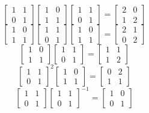 \documentclass[12pt]{article}
\begin{document}
    \[ \begin{bmatrix} 1 & 1 \\
        0 & 1 \end{bmatrix}
        \begin{bmatrix} 1 & 0 \\
            1 & 1 \end{bmatrix}
        \begin{bmatrix} 1 & 1 \\
            0 & 1 \end{bmatrix}
        = \begin{bmatrix} 2 & 0 \\
        1 & 2 \end{bmatrix}  \]
    \[ \begin{bmatrix} 1 & 0 \\
        1 & 1 \end{bmatrix}
        \begin{bmatrix} 1 & 1 \\
            0 & 1 \end{bmatrix}
        \begin{bmatrix} 1 & 0 \\
            1 & 1 \end{bmatrix}
        = \begin{bmatrix} 2 & 1 \\
        0 & 2 \end{bmatrix}  \]
    \[ \begin{bmatrix} 1 & 0 \\
        1 & 1 \end{bmatrix}
        \begin{bmatrix} 1 & 1 \\
            0 & 1 \end{bmatrix}
        = \begin{bmatrix} 1 & 1 \\
        1 & 2 \end{bmatrix}  \]
    \[ \begin{bmatrix} 1 & 1 \\
        0 & 1 \end{bmatrix}^2
        \begin{bmatrix} 1 & 0 \\
            1 & 1 \end{bmatrix}
        = \begin{bmatrix} 0 & 2 \\
        1 & 1 \end{bmatrix}  \]
    \[ \begin{bmatrix} 1 & 1 \\
        0 & 1 \end{bmatrix}
        \begin{bmatrix} 1 & 1 \\
        0 & 1 \end{bmatrix}^{-1}
        = \begin{bmatrix} 1 & 0 \\
        0 & 1 \end{bmatrix} \]
\end{document}
